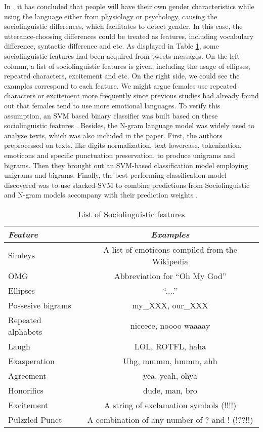 \documentclass[runningheads]{llncs}
\begin{document}
	In \cite{jinyu2014study}, it has concluded that people will have their own gender characteristics while using the language either from physiology or psychology, causing the sociolinguistic differences, which facilitates to detect gender. In this case, the utterance-choosing differences could be treated as features, including vocabulary difference, syntactic difference and etc. As displayed in Table \ref{table:linguistic-feature}, some sociolinguistic features had been acquired from tweets messages. On the left column, a list of sociolinguistic features is given, including the usage of ellipses, repeated characters, excitement and etc. On the right side, we could see the examples correspond to each feature. We might argue females use repeated characters or excitement more frequently since previous studies had already found out that females tend to use more emotional languages. To verify this assumption, an SVM \cite{suykens1999least}based binary classifier was built based on these sociolinguistic features \cite{rao2010classifying}. Besides, the N-gram language model was widely used to analyze texts, which was also included in the paper. First, the authors preprocessed on texts, like digits normalization, text lowercase, tokenization, emoticons and specific punctuation preservation, to produce unigrams and bigrams. Then they brought out an SVM-based classification model employing unigrams and bigrams. Finally, the best performing classification model discovered was to use stacked-SVM to combine predictions from Sociolinguistic and N-gram models accompany with their prediction weights \cite{rao2010classifying}.
	
	\begin{table}
		\caption{List of Sociolinguistic features  \cite{rao2010classifying}}
		\centering
		\begin{tabular}{| l | c |}
			\hline
			\textit{Feature} & \textit{Examples} \\
			\hline
			Simleys & A list of emoticons compiled from the Wikipedia\\
			OMG & Abbreviation for \enquote{Oh My God}  \\
			Ellipses &  \enquote{....}\\
			Possesive bigrams & my\_XXX, our\_XXX \\
			Repeated alphabets & niceeee, noooo waaaay \\
			Laugh & LOL, ROTFL, haha \\
			Exasperation & Uhg, mmmm, hmmm, ahh \\
			Agreement & yea, yeah, ohya \\
			Honorifics &  dude, man, bro\\
			Excitement &  A string of exclamation symbols (!!!!)\\
			Pulzzled Punct &  A combination of any number of ? and ! (!??!!)\\
			\hline
		\end{tabular}
		\label{table:linguistic-feature}
	\end{table}
	
\end{document}
